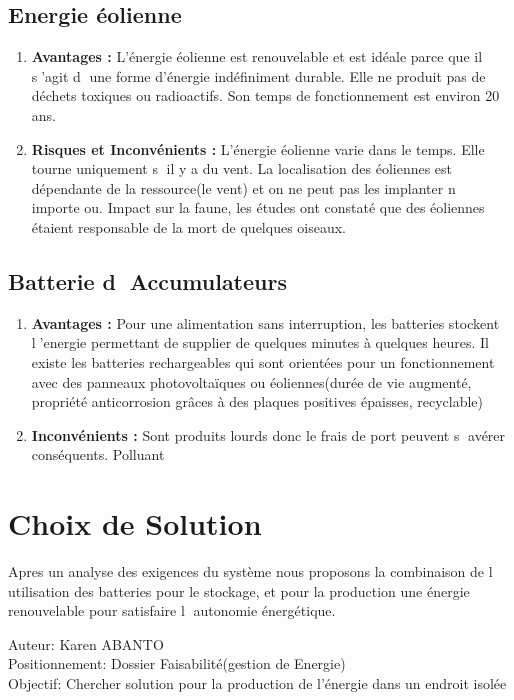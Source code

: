 \documentclass [a4paper] {report}
\begin{document}
\subsection{Energie \'{e}olienne}
\begin{enumerate}
\item \textbf{Avantages :}
L'\'{e}nergie \'{e}olienne est renouvelable et est id\'{e}ale parce que il s'agit d une forme d'\'{e}nergie ind\'{e}finiment durable.
Elle ne produit pas de d\'{e}chets toxiques ou radioactifs. 
Son temps de fonctionnement est environ 20 ans.

\item \textbf{Risques et Inconv\'enients :}
L'\'{e}nergie \'{e}olienne varie dans le temps.  Elle tourne uniquement s il y a du vent.
La localisation des \'{e}oliennes est d\'{e}pendante de la ressource(le vent) et on ne peut pas les implanter n importe ou. 
Impact sur la faune, les \'{e}tudes ont constat\'{e} que des \'{e}oliennes \'{e}taient responsable de la mort de quelques oiseaux.
\end{enumerate}


\subsection{Batterie d Accumulateurs}
\begin{enumerate}
\item \textbf{Avantages :}
Pour une alimentation sans interruption, les batteries stockent l'energie permettant de supplier de quelques minutes à quelques heures.
Il existe les batteries rechargeables qui sont orient\'{e}es pour un fonctionnement avec des panneaux photovoltaïques ou  \'{e}oliennes(dur\'{e}e de vie augment\'{e}, propriét\'{e} anticorrosion grâces à des plaques positives \'{e}paisses, recyclable)

\item \textbf{Inconv\'{e}nients :}
Sont produits lourds donc le frais de port peuvent s av\'{e}rer cons\'{e}quents.
Polluant

\end{enumerate}

\section{Choix de Solution}
Apres un analyse des exigences du syst\`eme nous proposons la combinaison de l utilisation des batteries pour le stockage, et pour la production une \'{e}nergie renouvelable pour satisfaire l autonomie \'{e}nerg\'{e}tique.


\bigskip Auteur: Karen ABANTO\\
Positionnement: Dossier Faisabilit\'{e}(gestion de Energie)\\
Objectif: Chercher solution pour la production de l'\'{e}nergie dans un endroit isol\'{e}e
\end{document}

